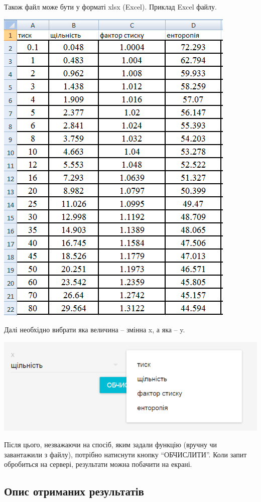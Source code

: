 \documentclass[ukrainian,14pt]{extarticle}
\begin{document}
\begin{enumerate}
Також файл може бути у форматі xlsx (Excel). Приклад Excel файлу.

\includegraphics[scale=1]{program_screenshots/excel.png}
\end{enumerate}

Далі необхідно вибрати яка величина – змінна x, а яка – y.

\includegraphics[scale=1]{program_screenshots/x_y_chooser.png}

Після цього, незважаючи на спосіб, яким задали функцію (вручну чи завантажили з файлу), потрібно натиснути кнопку “ОБЧИСЛИТИ”. Коли запит обробиться на сервері, результати можна побачити на екрані.

\subsection{Опис отриманих результатів}
\end{document}
